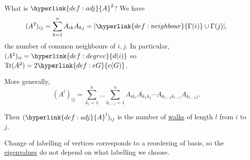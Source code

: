 \documentclass{article}
\DeclareMathOperator{\Tr}{Tr}
\begin{document}
What is $\hyperlink{def:adj}{A}^2$?
We have
\begin{equation*}(A^2)_{ij} = \sum_{k=1}^n A_{ik} A_{kj} = |\hyperlink{def:neighbour}{\Gamma(i)} \cup \Gamma(j)|,\end{equation*}
the number of common neighbours of $i,j$.
In particular, $(A^2)_{ii} = \hyperlink{def:degree}{d(i)}$ so $\Tr(A^2) = 2 \hyperlink{def:eG}{e(G)}$.

More generally,
\begin{equation*}
    (A^l)_{ij} = \sum_{k_i=1}^n \dots \sum_{k_{l-1}=1}^n A_{i k_1} A_{k_1 k_2} \dotsm A_{k_{l-2} k_{l-1}} A_{k_{l-1} j}.
\end{equation*}

Then $(\hyperlink{def:adj}{A}^l)_{ij}$ is the number of \hyperlink{def:walk}{walks} of length $l$ from $i$ to $j$.

\begin{remark}
    Change of labelling of vertices corresponds to a reordering of basis, so the \hyperlink{def:eigen}{eigenvalues} do not depend on what labelling we choose.
\end{remark}
\end{document}
